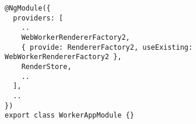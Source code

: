 \begin{verbatim}
@NgModule({
  providers: [
    ..
    WebWorkerRendererFactory2,
    { provide: RendererFactory2, useExisting: WebWorkerRendererFactory2 },
    RenderStore,
    ..
  ],
  ..
})
export class WorkerAppModule {}
\end{verbatim}
